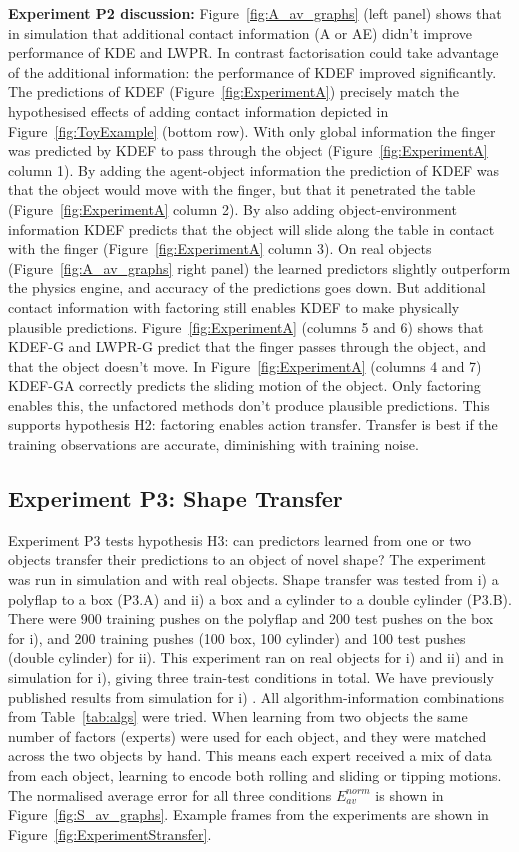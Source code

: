 {\bf Experiment P2 discussion:} Figure~\ref{fig:A_av_graphs} (left panel) shows that in simulation that additional contact information (A or AE) didn't improve performance of KDE and LWPR. In contrast factorisation could take advantage of the additional information: the performance of KDEF improved significantly. The predictions of KDEF (Figure~\ref{fig:ExperimentA}) precisely match the hypothesised
effects of adding contact information depicted in Figure~\ref{fig:ToyExample} (bottom row). With only global information the finger was predicted by KDEF to pass through the object (Figure~\ref{fig:ExperimentA} column 1). By adding the agent-object information the prediction of KDEF was that the object would move with the finger, but that it penetrated the table (Figure~\ref{fig:ExperimentA} column 2). By also adding object-environment information KDEF predicts that the object will slide along the table in contact with the finger (Figure~\ref{fig:ExperimentA} column 3). On real objects (Figure~\ref{fig:A_av_graphs} right panel) the learned predictors slightly outperform the physics engine, and accuracy of the predictions goes down. But additional contact information with factoring still enables KDEF to make physically plausible predictions. Figure~\ref{fig:ExperimentA} (columns 5 and 6) shows that KDEF-G and LWPR-G predict that the finger passes through the object, and that the object doesn't move. In Figure~\ref{fig:ExperimentA} (columns 4 and 7) KDEF-GA correctly predicts the sliding motion of the object. Only factoring enables this, the unfactored methods don't produce plausible predictions. This supports hypothesis H2: factoring enables action transfer. Transfer is best if the training observations are accurate, diminishing with training noise. 

\subsection{Experiment P3:  Shape Transfer}\label{sec:Results.Shape}

Experiment P3 tests hypothesis H3: can predictors learned from one or two objects transfer their predictions to an object of novel shape? The experiment was run in simulation and with real objects. Shape transfer was tested from i) a polyflap to a box (P3.A) and ii) a box and a cylinder to a double cylinder (P3.B). There were 900 training pushes on the polyflap and 200 test pushes on the box for i), and 200 training pushes (100 box, 100 cylinder) and 100 test pushes (double cylinder) for ii). This experiment ran on real objects for i) and ii) and in simulation for i), giving three train-test conditions in total. We have previously published results from simulation for i) \cite{kopicki-etal-icra11}. All algorithm-information combinations from Table~\ref{tab:algs} were tried. When learning from two objects the same number of factors (experts) were used for each object, and they were matched across the two objects by hand. This means each expert received a mix of data from each object, learning to encode both rolling and sliding or tipping motions.  The normalised average error for all three conditions $E_{av}^{norm}$ is shown in Figure~\ref{fig:S_av_graphs}. Example frames from the experiments are shown in Figure~\ref{fig:ExperimentStransfer}.

